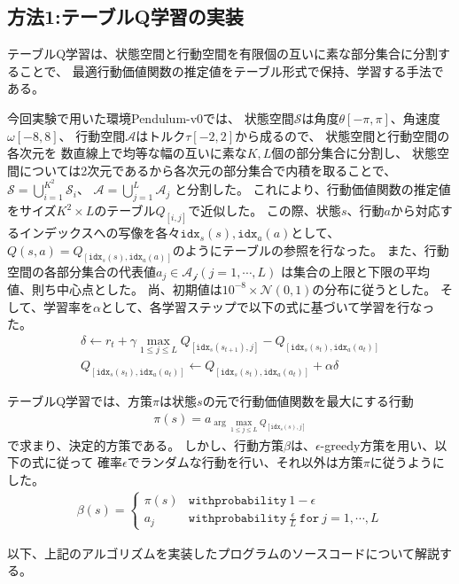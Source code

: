 \documentclass[a4paper,11pt]{jsarticle}
\begin{document}
\subsection{方法1:テーブルQ学習の実装}
テーブルQ学習は、状態空間と行動空間を有限個の互いに素な部分集合に分割することで、
最適行動価値関数の推定値をテーブル形式で保持、学習する手法である。\par
今回実験で用いた環境Pendulum-v0では、
状態空間$\mathcal{S}$は角度$\theta [-\pi, \pi]$、角速度$\omega [-8, 8]$、
行動空間$\mathcal{A}$はトルク$\tau [-2, 2]$から成るので、
状態空間と行動空間の各次元を
数直線上で均等な幅の互いに素な$K,L$個の部分集合に分割し、
状態空間については2次元であるから各次元の部分集合で内積を取ることで、
$\mathcal{S} = \bigcup_{i=1}^{K^2}  \mathcal{S}_{i}$、
$\mathcal{A} = \bigcup_{j=1}^L  \mathcal{A}_j$
と分割した。
これにより、行動価値関数の推定値をサイズ$K^2\times L$のテーブル$Q_{[i,j]}$で近似した。
この際、状態$s$、行動$a$から対応するインデックスへの写像を各々$\mathtt{idx}_s(s),\mathtt{idx}_a(a)$として、
$Q(s,a) = Q_{[\mathtt{idx}_s(s), \mathtt{idx}_a(a)]}$のようにテーブルの参照を行なった。
また、行動空間の各部分集合の代表値$a_j \in \mathcal{A_j} (j=1,\cdots,L)$
は集合の上限と下限の平均値、則ち中心点とした。
尚、初期値は$10^{-8}\times\mathcal{N}(0,1)$の分布に従うとした。
そして、学習率を$\alpha$として、各学習ステップで以下の式に基づいて学習を行なった。
\begin{align}
  \delta \longleftarrow r_t + \gamma \max_{1\leq j\leq L} Q_{[\mathtt{idx}_s(s_{t+1}), j]} - Q_{[\mathtt{idx}_s(s_{t}), \mathtt{idx}_a(a_{t})]} \label{Q1}\\
  Q_{[\mathtt{idx}_s(s_{t}), \mathtt{idx}_a(a_{t})]} \longleftarrow Q_{[\mathtt{idx}_s(s_{t}), \mathtt{idx}_a(a_{t})]} + \alpha \delta \label{Q2}
\end{align}

テーブルQ学習では、方策$\pi$は状態$s$の元で行動価値関数を最大にする行動
\begin{align}
  \pi(s) = a_{\arg\max_{1\leq j\leq L} Q_{[\mathtt{idx}_s(s), j]}} \label{Qpi}
\end{align}
で求まり、決定的方策である。
しかし、行動方策$\beta$は、$\epsilon$-greedy方策を用い、以下の式に従って
確率$\epsilon$でランダムな行動を行い、それ以外は方策$\pi$に従うようにした。
\begin{align}
  \beta(s) = 
  \left\{\begin{array}{ll}
    \pi(s) & \mathtt{with probability}\ 1-\epsilon\\
    a_j & \mathtt{with probability}\ \frac{\epsilon}{L}\ \mathtt{for}\ j=1,\cdots,L
  \end{array}\right. \label{Qbeta}
\end{align}
\par
以下、上記のアルゴリズムを実装したプログラムのソースコードについて解説する。
\end{document}
